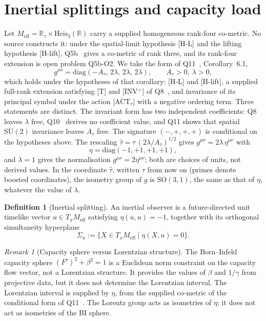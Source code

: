 \documentclass[12pt,a4paper]{article}
\theoremstyle{remark}
\newtheorem{remark}[theorem]{Remark}
\theoremstyle{definition}
\newtheorem{definition}[theorem]{Definition}
\newcommand{\SO}{\mathrm{SO}}
\newcommand{\Meff}{M_{\mathrm{eff}}}
\begin{document}
  \section{Inertial splittings and capacity load}
    \label{sec:splittings}

    Let $\Meff = \mathbb{R}_\tau \times \mathrm{Heis}_3(\mathbb{R})$ carry a supplied homogeneous rank-four
    co-metric.
    No source constructs it: under the spatial-limit hypothesis [H-L] and the lifting hypothesis [H-lift],
    Q5b~\cite{Beau2026q5b} gives a co-metric of rank three, and its rank-four extension is open problem Q5b-O2.
    We take the form of Q11~\cite{Beau2026q11}, Corollary~6.1,
    \[
      g^{\mu\nu} = \mathrm{diag}(-A_\tau,\, 2\lambda,\, 2\lambda,\, 2\lambda),
      \qquad A_\tau > 0,\ \lambda > 0,
    \]
    which holds under the hypotheses of that corollary: [H-L] and [H-lift], a supplied full-rank extension
    satisfying [T] and [INV$^+$] of Q8~\cite{BeauQ8}, and invariance of its principal symbol under the action
    [ACT$_\tau$] with a negative ordering term.
    Three statements are distinct.
    The invariant form has two independent coefficients: Q8 leaves $\lambda$ free, Q10~\cite{Beau2026q10} derives
    no coefficient value, and Q11 shows that spatial $\mathrm{SU}(2)$ invariance leaves $A_\tau$ free.
    The signature $(-,+,+,+)$ is conditional on the hypotheses above.
    The rescaling $\hat\tau = \tau\,(2\lambda/A_\tau)^{1/2}$ gives $g^{\mu\nu} = 2\lambda\,\eta^{\mu\nu}$ with
    \[
      \eta = \mathrm{diag}(-1,+1,+1,+1),
    \]
    and $\lambda = 1$ gives the normalisation $g^{\mu\nu} = 2\eta^{\mu\nu}$; both are choices of units, not
    derived values.
    In the coordinate $\hat\tau$, written $\tau$ from now on (primes denote boosted coordinates),
    the isometry group of $g$ is $\SO(3,1)$, the same as that
    of $\eta$, whatever the value of $\lambda$.

    \begin{definition}[Inertial splitting]
      \label{def:inertial-splitting}
      An inertial observer is a future-directed unit timelike vector $u \in T_x\Meff$
      satisfying $\eta(u,u) = -1$, together with its orthogonal simultaneity hyperplane
      \[
        \Sigma_u := \bigl\{ X \in T_x\Meff \mid \eta(X,u) = 0 \bigr\}.
      \]
    \end{definition}

    \begin{remark}[Capacity sphere versus Lorentzian structure]
      \label{rem:bi-vs-lorentz}
      The Born--Infeld capacity sphere $(F^\tau)^2 + \beta^2 = 1$ is a Euclidean norm
      constraint on the capacity flow vector, not a Lorentzian structure.
      It provides the values of $\beta$ and $1/\gamma$ from projective data, but it does not
      determine the Lorentzian interval.
      The Lorentzian interval is supplied by $\eta$, from the supplied co-metric of the conditional form of
      Q11~\cite{Beau2026q11}.
      The Lorentz group acts as isometries of $\eta$; it does not act as isometries of the
      BI sphere.
    \end{remark}
\end{document}
